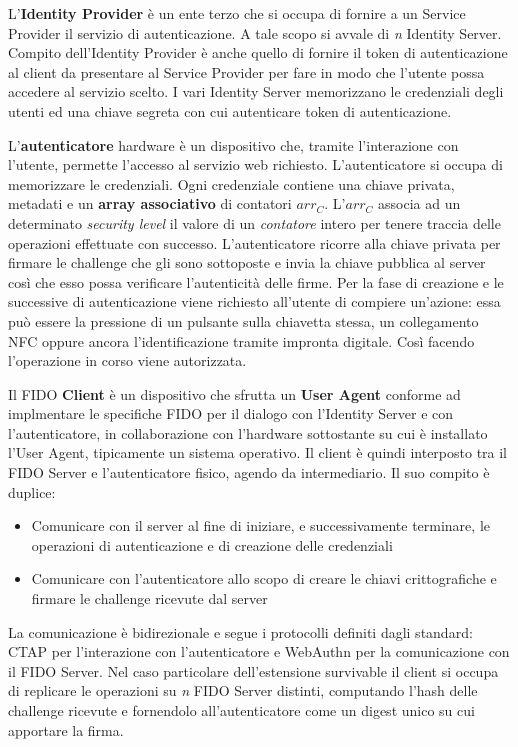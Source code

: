 L'\textbf{Identity Provider} è un ente terzo che si occupa di fornire a un Service Provider il servizio di autenticazione. A tale scopo si avvale di \emph{n} Identity Server.
Compito dell'Identity Provider è anche quello di fornire il token di autenticazione al client da presentare al Service Provider per fare in modo che l'utente possa accedere al servizio scelto.
I vari Identity Server memorizzano le credenziali degli utenti ed una chiave segreta con cui autenticare token di autenticazione.

L'\textbf{autenticatore} hardware è un dispositivo che, tramite l'interazione con l'utente, permette l'accesso al servizio web richiesto. L'autenticatore si occupa di memorizzare le credenziali. Ogni credenziale contiene una chiave privata, metadati e un \textbf{array associativo} di contatori ${arr_C}$. L'${arr_C}$ associa ad un determinato \emph{security level} il valore di un \emph{contatore} intero per tenere traccia delle operazioni effettuate con successo. L'autenticatore ricorre alla chiave privata per firmare le challenge che gli sono sottoposte e invia la chiave pubblica al server così che esso possa verificare l'autenticità delle firme. 
Per la fase di creazione e le successive di autenticazione viene richiesto all'utente di compiere un'azione: essa può essere la pressione di un pulsante sulla chiavetta stessa, un collegamento NFC oppure ancora l'identificazione tramite impronta digitale. Così facendo l'operazione in corso viene autorizzata.

Il FIDO \textbf{Client} è un dispositivo che sfrutta un \textbf{User Agent} conforme ad implmentare le specifiche FIDO per il dialogo con l'Identity Server e con l'autenticatore, in collaborazione con l'hardware sottostante su cui è installato l'User Agent, tipicamente un sistema operativo. Il client è quindi interposto tra il FIDO Server e l'autenticatore fisico, agendo da intermediario. Il suo compito è duplice:
\begin{itemize}
	\item Comunicare con il server al fine di iniziare, e successivamente terminare, le operazioni di autenticazione e di creazione delle credenziali 
	\item Comunicare con l'autenticatore allo scopo di creare le chiavi crittografiche e firmare le challenge ricevute dal server
\end{itemize}
La comunicazione è bidirezionale e segue i protocolli definiti dagli standard: CTAP per l'interazione con l'autenticatore e WebAuthn per la comunicazione con il FIDO Server. 
Nel caso particolare dell'estensione survivable il client si occupa di replicare le operazioni su \emph{n} FIDO Server distinti, computando l'hash delle challenge ricevute e fornendolo all'autenticatore come un digest unico su cui apportare la firma. 


